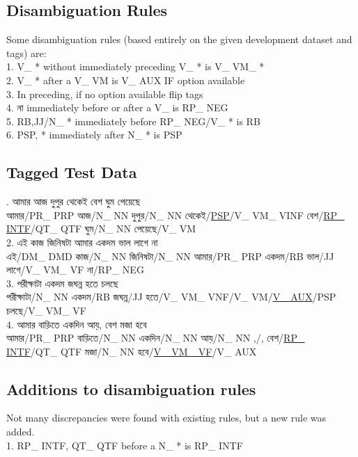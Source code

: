 \documentclass[11pt,a4paper,twocolumn]{article}
\begin{document}
	\subsection{Disambiguation Rules}
	
	Some disambiguation rules (based entirely on the given 
	development dataset and tags) are:\\
	1. V\_ * without immediately preceding V\_ * is V\_ VM\_ *\\
	2. V\_ * after a V\_ VM is V\_ AUX IF option available\\
	3. In preceding, if no option available flip tags\\
	4. {\bg না} immediately before or after a V\_ is RP\_ NEG\\
	5. {RB,JJ/N\_ *} immediately before RP\_ NEG/V\_ * is RB\\
	6. {PSP, *} immediately after N\_ * is PSP\\
	
	
	\subsection{Tagged Test Data}	
	{. \textcolor{diff}{আমার আজ দুপুর থেকেই বেশ ঘুম পেয়েছে}\\
আমার\textcolor{hlit}{/PR\_ PRP}
আজ\textcolor{hlit}{/N\_ NN}
দুপুর\textcolor{hlit}{/N\_ NN}
থেকেই\textcolor{hlit}{/\underline{PSP}/V\_ VM\_ VINF}
বেশ\textcolor{hlit}{/\underline{RP\_ INTF}/QT\_ QTF}
ঘুম\textcolor{hlit}{/N\_ NN}
পেয়েছে\textcolor{hlit}{/V\_ VM}\\
$ $\\
2. \textcolor{diff}{এই কাজ জিনিষটা আমার একদম ভাল লাগে না}\\
এই\textcolor{hlit}{/DM\_ DMD}
কাজ\textcolor{hlit}{/N\_ NN}
জিনিষটা\textcolor{hlit}{/N\_ NN}
আমার\textcolor{hlit}{/PR\_ PRP}
একদম\textcolor{hlit}{/RB}
ভাল\textcolor{hlit}{/JJ}
লাগে\textcolor{hlit}{/V\_ VM\_ VF}
না\textcolor{hlit}{/RP\_ NEG}\\
$ $\\
3. \textcolor{diff}{পরীক্ষাটা একদম জঘন্ন হতে চলছে}\\
পরীক্ষাটা\textcolor{hlit}{/N\_ NN}
একদম\textcolor{hlit}{/RB}
জঘন্ন\textcolor{hlit}{/JJ}
হতে\textcolor{hlit}{/V\_ VM\_ VNF/V\_ VM/\underline{V\_ AUX}/PSP}
চলছে\textcolor{hlit}{/V\_ VM\_ VF}\\
$ $\\
4. \textcolor{diff}{আমার বাড়িতে একদিন আয়, বেশ মজা হবে}\\
আমার\textcolor{hlit}{/PR\_ PRP}
বাড়িতে\textcolor{hlit}{/N\_ NN}
একদিন\textcolor{hlit}{/N\_ NN}
আয়\textcolor{hlit}{/N\_ NN}
,\textcolor{hlit}{/,}
বেশ\textcolor{hlit}{/\underline{RP\_ INTF}/QT\_ QTF}
মজা\textcolor{hlit}{/N\_ NN}
হবে\textcolor{hlit}{/\underline{V\_ VM\_ VF}/V\_ AUX}\\
$ $\\
	}
	\subsection{Additions to disambiguation rules}
	Not many discrepancies were found with existing rules, but
	a new rule was added.\\
	1. {RP\_ INTF, QT\_ QTF} before a N\_ * is RP\_ INTF
\end{document}
